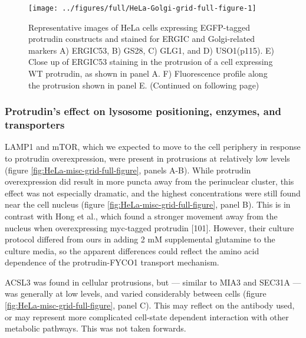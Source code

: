 \documentclass[
  12pt,
  a4paper,
]{book}
\begin{document}
\begin{figure}
\texttt{[image: ../figures/full/HeLa-Golgi-grid-full-figure-1]} \caption[Protrudin-expressing HeLa cells stained for ERGIC53, GS28, GLG1, and USO1]{Representative images of HeLa cells expressing EGFP-tagged protrudin constructs and stained for ERGIC and Golgi-related markers A) ERGIC53, B) GS28, C) GLG1, and D) USO1(p115). E) Close up of ERGIC53 staining in the protrusion of a cell expressing WT protrudin, as shown in panel A. F) Fluorescence profile along the protrusion shown in panel E. (Continued on following page)}\label{fig:HeLa-Golgi-grid-full-figure}
\end{figure}

\begin{figure}[h]
\end{figure}

\subsubsection{Protrudin's effect on lysosome positioning, enzymes, and transporters}\label{protrudins-effect-on-lysosome-positioning-enzymes-and-transporters}

LAMP1 and mTOR, which we expected to move to the cell periphery in response to protrudin overexpression, were present in protrusions at relatively low levels (figure \ref{fig:HeLa-misc-grid-full-figure}, panels A-B). While protrudin overexpression did result in more puncta away from the perinuclear cluster, this effect was not especially dramatic, and the highest concentrations were still found near the cell nucleus (figure \ref{fig:HeLa-misc-grid-full-figure}, panel B). This is in contrast with Hong et al., which found a stronger movement away from the nucleus when overexpressing myc-tagged protrudin {[}101{]}. However, their culture protocol differed from ours in adding 2 mM supplemental glutamine to the culture media, so the apparent differences could reflect the amino acid dependence of the protrudin-FYCO1 transport mechanism.

ACSL3 was found in cellular protrusions, but --- similar to MIA3 and SEC31A --- was generally at low levels, and varied considerably between cells (figure \ref{fig:HeLa-misc-grid-full-figure}, panel C). This may reflect on the antibody used, or may represent more complicated cell-state dependent interaction with other metabolic pathways. This was not taken forwards.
\end{document}
